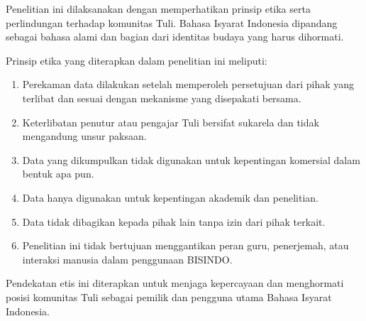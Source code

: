Penelitian ini dilaksanakan dengan memperhatikan prinsip etika serta perlindungan terhadap komunitas Tuli.  
Bahasa Isyarat Indonesia dipandang sebagai bahasa alami dan bagian dari identitas budaya yang harus dihormati.  

Prinsip etika yang diterapkan dalam penelitian ini meliputi:  
\begin{enumerate}[noitemsep]
    \item Perekaman data dilakukan setelah memperoleh persetujuan dari pihak yang terlibat dan sesuai dengan mekanisme yang disepakati bersama.  
    \item Keterlibatan penutur atau pengajar Tuli bersifat sukarela dan tidak mengandung unsur paksaan.  
    \item Data yang dikumpulkan tidak digunakan untuk kepentingan komersial dalam bentuk apa pun.  
    \item Data hanya digunakan untuk kepentingan akademik dan penelitian.  
    \item Data tidak dibagikan kepada pihak lain tanpa izin dari pihak terkait.  
    \item Penelitian ini tidak bertujuan menggantikan peran guru, penerjemah, atau interaksi manusia dalam penggunaan BISINDO.  
\end{enumerate}

Pendekatan etis ini diterapkan untuk menjaga kepercayaan dan menghormati posisi komunitas Tuli sebagai pemilik dan pengguna utama Bahasa Isyarat Indonesia.  